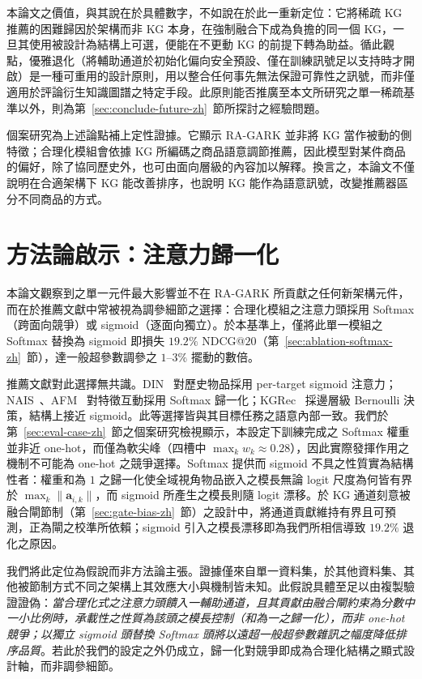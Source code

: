 本論文之價值，與其說在於具體數字，不如說在於此一重新定位：它將稀疏 KG 推薦的困難歸因於架構而非 KG 本身，在強制融合下成為負擔的同一個 KG，一旦其使用被設計為結構上可選，便能在不更動 KG 的前提下轉為助益。循此觀點，優雅退化（將輔助通道於初始化偏向安全預設、僅在訓練訊號足以支持時才開啟）是一種可重用的設計原則，用以整合任何事先無法保證可靠性之訊號，而非僅適用於評論衍生知識圖譜之特定手段。此原則能否推廣至本文所研究之單一稀疏基準以外，則為第~\ref{sec:conclude-future-zh}~節所探討之經驗問題。

個案研究為上述論點補上定性證據。它顯示 RA-GARK 並非將 KG 當作被動的側特徵；合理化模組會依據 KG 所編碼之商品語意調節推薦，因此模型對某件商品的偏好，除了協同歷史外，也可由面向層級的內容加以解釋。換言之，本論文不僅說明在合適架構下 KG 能改善排序，也說明 KG 能作為語意訊號，改變推薦器區分不同商品的方式。

\section{方法論啟示：注意力歸一化}
\label{sec:conclude-insight-zh}

本論文觀察到之單一元件最大影響並不在 RA-GARK 所貢獻之任何新架構元件，而在於推薦文獻中常被視為調參細節之選擇：合理化模組之注意力頭採用 Softmax（跨面向競爭）或 sigmoid（逐面向獨立）。於本基準上，僅將此單一模組之 Softmax 替換為 sigmoid 即損失 $19.2\%$ NDCG@$20$（第~\ref{sec:ablation-softmax-zh}~節），達一般超參數調參之 $1$--$3\%$ 擺動的數倍。

推薦文獻對此選擇無共識。DIN~\cite{zhou2018din} 對歷史物品採用 per-target sigmoid 注意力；NAIS~\cite{he2018nais}、AFM~\cite{xiao2017afm} 對特徵互動採用 Softmax 歸一化；KGRec~\cite{yang2023kgrec} 採邊層級 Bernoulli 決策，結構上接近 sigmoid。此等選擇皆與其目標任務之語意內部一致。我們於第~\ref{sec:eval-case-zh}~節之個案研究檢視顯示，本設定下訓練完成之 Softmax 權重並非近 one-hot，而僅為軟尖峰（四槽中 $\max_k w_k \approx 0.28$），因此實際發揮作用之機制不可能為 one-hot 之競爭選擇。Softmax 提供而 sigmoid 不具之性質實為結構性者：權重和為 $1$ 之歸一化使全域視角物品嵌入之模長無論 logit 尺度為何皆有界於 $\max_k \|\mathbf{a}_{i,k}\|$，而 sigmoid 所產生之模長則隨 logit 漂移。於 KG 通道刻意被融合閘節制（第~\ref{sec:gate-bias-zh}~節）之設計中，將通道貢獻維持有界且可預測，正為閘之校準所依賴；sigmoid 引入之模長漂移即為我們所相信導致 $19.2\%$ 退化之原因。

我們將此定位為假說而非方法論主張。證據僅來自單一資料集，於其他資料集、其他被節制方式不同之架構上其效應大小與機制皆未知。此假說具體至足以由複製驗證證偽：\emph{當合理化式之注意力頭饋入一輔助通道，且其貢獻由融合閘約束為分數中一小比例時，承載性之性質為該頭之模長控制（和為一之歸一化），而非 one-hot 競爭；以獨立 sigmoid 頭替換 Softmax 頭將以遠超一般超參數雜訊之幅度降低排序品質}。若此於我們的設定之外仍成立，歸一化對競爭即成為合理化結構之顯式設計軸，而非調參細節。

